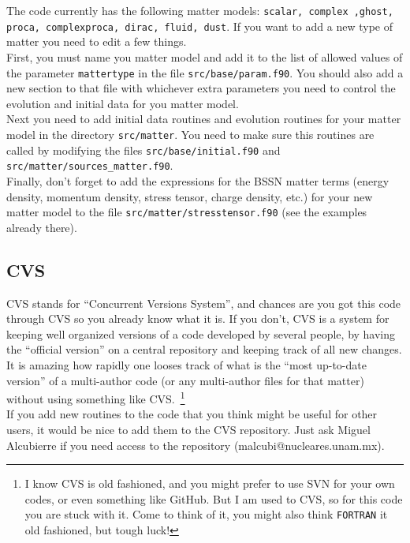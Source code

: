 \documentclass[12pt]{article}
\begin{document}
The code currently has the following matter models: \texttt{scalar,
  complex ,ghost, proca, \linebreak complexproca, dirac, fluid, dust}.
If you want to add a new type of matter you need to edit a few
things. \\

First, you must name you matter model and add it to the list of
allowed values of the parameter \texttt{mattertype} in the file
\texttt{src/base/param.f90}.  You should also add a new section to that file
with whichever extra parameters you need to control the evolution
and initial data for you matter model. \\

Next you need to add initial data routines and evolution routines for
your matter model in the directory \texttt{src/matter}.  You need to
make sure this routines are called by modifying the files
\texttt{src/base/initial.f90} and
\texttt{src/matter/sources\_matter.f90}. \\

Finally, don't forget to add the expressions for the BSSN matter terms
(energy density, momentum density, stress tensor, charge density,
etc.) for your new matter model to the file
\texttt{src/matter/stresstensor.f90} (see the examples already
there). \\


\subsection{CVS}

CVS stands for ``Concurrent Versions System'', and chances are you got
this code through CVS so you already know what it is.  If you don't,
CVS is a system for keeping well organized versions of a code
developed by several people, by having the ``official version'' on a
central repository and keeping track of all new changes. It is amazing
how rapidly one looses track of what is the ``most up-to-date
version'' of a multi-author code (or any multi-author files for that
matter) without using something like CVS.~\footnote{I know CVS is old
  fashioned, and you might prefer to use SVN for your own codes, or
  even something like GitHub. But I am used to CVS, so for this code
  you are stuck with it. Come to think of it, you might also think
  \texttt{FORTRAN} it old fashioned, but tough luck!} \\

If you add new routines to the code that you think might be useful for
other users, it would be nice to add them to the CVS repository.  Just
ask Miguel Alcubierre if you need access to the repository
(malcubi@nucleares.unam.mx). \\
\end{document}
